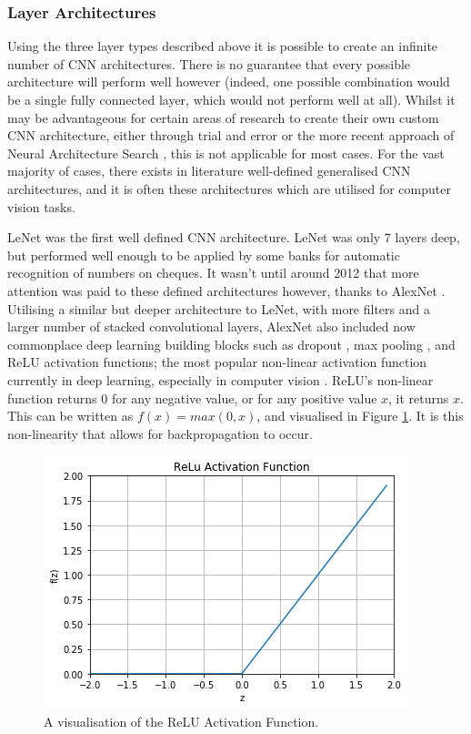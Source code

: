 \subsubsection{Layer Architectures}\label{ch:Background,sec:CNN,sub:CNN,subsub:layerArchitecture}

Using the three layer types described above it is possible to create an infinite number of CNN architectures. There is no guarantee that every possible architecture will perform well however (indeed, one possible combination would be a single fully connected layer, which would not perform well at all). Whilst it may be advantageous for certain areas of research to create their own custom CNN architecture, either through trial and error or the more recent approach of Neural Architecture Search \cite{elsken_neural_2018}, this is not applicable for most cases. For the vast majority of cases, there exists in literature well-defined generalised CNN architectures, and it is often these architectures which are utilised for computer vision tasks. 

LeNet \cite{lecun_gradient-based_1998} was the first well defined CNN architecture. LeNet was only 7 layers deep, but performed well enough to be applied by some banks for automatic recognition of numbers on cheques. It wasn't until around 2012 that more attention was paid to these defined architectures however, thanks to AlexNet \cite{krizhevsky_imagenet_2012}. Utilising a similar but deeper architecture to LeNet, with more filters and a larger number of stacked convolutional layers, AlexNet also included now commonplace deep learning building blocks such as dropout \cite{srivastava_dropout:_2014}, max pooling \cite{boureau_theoretical_2010}, and ReLU activation functions; the most popular non-linear activation function currently in deep learning, especially in computer vision \cite{he_delving_2015}. ReLU's non-linear function returns 0 for any negative value, or for any positive value $x$, it returns $x$. This can be written as $f(x) = max(0,x)$, and visualised in Figure \ref{fig:relu}. It is this non-linearity that allows for backpropagation to occur.

\begin{figure}
	\begin{center}
		\includegraphics[scale=0.6]{Chapter2/figs/relu.png}
	\end{center}
	\caption{A visualisation of the ReLU Activation Function.}
	\label{fig:relu}
\end{figure}

